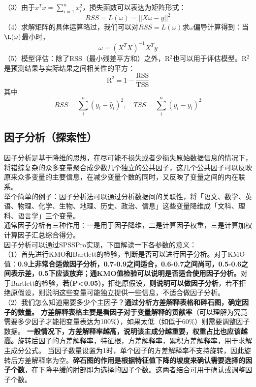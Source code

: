 \documentclass[11pt,a4paper]{article}
\begin{document}
（3）由于$x^Tx=\sum\limits_{i=1}^{n}x_i^2$，损失函数可以表达为矩阵形式：
\begin{equation*}
	RSS=L(\omega)=||X\omega - y||^2
\end{equation*}
（4）求解矩阵的具体运算略过，我们可以对$RSS=L(\omega)$求$\omega$偏导计算得到：当$\L(\omega)$最小时，
\begin{equation*}
	\omega=(X^TX)^{-1}X^T y
\end{equation*}
（5）模型评估：除了RSS（最小残差平方和）之外，R$^2$也可以用于评估模型。R$^2$是预测结果与实际结果之间相关性的平方：
\begin{equation*}
	\mathrm{R}^2=1-\dfrac{\mathrm{RSS}}{\mathrm{TSS}}
\end{equation*}
其中
\begin{equation*}
	RSS =\sum\limits_{i}^{n}(y_i-\hat y_i)^2
	,\quad
	TSS=\sum\limits_{i}^{n} (y_i-\bar y_i)^2
\end{equation*}

\subsection{因子分析（探索性）}
\indent\setlength{\parindent}{2em}因子分析是基于降维的思想，在尽可能不损失或者少损失原始数据信息的情况下，将错综复杂的众多变量聚合成少数几个独立的公共因子，这几个公共因子可以反映原来众多变量的主要信息，在减少变量个数的同时，又反映了变量之间的内在联系。\\
\indent\setlength{\parindent}{2em}举个简单的例子：因子分析法可以通过分析数据间的关联性，将「语文、数学、英语、物理、化学、生物、地理、历史、政治、信息」这些变量降维成「文科、理科、语言学」三个变量。\\
\indent\setlength{\parindent}{2em}通常因子分析有三种作用：一是用于因子降维，二是计算因子权重，三是计算加权计算因子汇总综合得分。\\
\indent\setlength{\parindent}{2em}因子分析可以通过SPSSPro实现，下面解读一下各参数的意义：\\
\noindent（1）首先进行KMO和Bartlett的检验，判断是否可以进行因子分析。对于KMO值：\textbf{0.9上非常合适做因子分析，0.7-0.9之间适合，0.6-0.7之间尚可，0.5-0.6之间表示差，0.5下应该放弃；通KMO值检验可以说明是否适合使用因子分析。}对于Bartlett的检验，\textbf{若(P<0.05)，}拒绝原假设，\textbf{则说明可以做因子分析}，若不拒绝原假设，则说明这些变量可能独立提供一些信息，不适合做因子分析。\\

\noindent（2）我们怎么知道需要多少个主因子？\textbf{通过分析方差解释表格和碎石图，确定因子的数量。 }\textbf{方差解释表格主要是看因子对于变量解释的贡献率}（可以理解为究竟需要多少因子才能把变量表达为100$\%$），如果太低（如低于60$\%$）则需要调整因子数据。 \textbf{一般情况下，方差解释率越高，说明该主成分越重要，权重占比也应该越高。}旋转后因子的方差解释率，特征根，方差解释率，累积方差解释率，用于求解主成分公式。 当因子数量设置为1时，单个因子的方差解释率不支持旋转，因此旋转后方差解释率为空。\textbf{碎石图的作用是根据特征值下降的坡度来确认需要选择的因子个数}，在下降平缓的肘部即为选择的因子个数。这两者结合可用于确认或调整因子个数。\\
\end{document}
